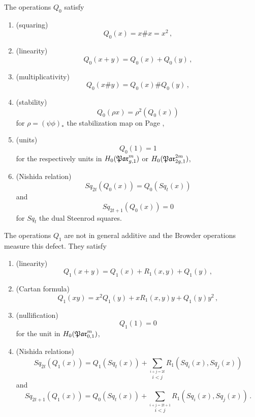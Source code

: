 \begin{prop}
    The operations $Q_0$ satisfy
    \begin{enumerate}
        \item (squaring)
            \[
                Q_0(x) = x \# x = x^2\,,
            \]
        \item (linearity)
            \[
                Q_0(x+y) = Q_0(x) + Q_0(y) \,,
            \]
        \item (multiplicativity)
            \[
                Q_0(x \# y) = Q_0(x) \# Q_0(y) \,,
            \]
        \item (stability)
            \[
                Q_0(\rho x) = \rho^2( Q_0(x))
            \]
            for $\rho = (\psi\phi)_\ast$ the stabilization map on Page \pageref{page:stabilization_map},
        \item (units)
            \[
                Q_0(1) = 1
            \]
            for the respectively units in $H_0( \mathfrak{Par}_{g,1}^m )$ or $H_0(\mathfrak{Par}_{2g,1}^{2m})$,
        \item (Nishida relation)
            \[
                Sq_{2t}(Q_0(x)) = Q_0(Sq_t(x))
            \]
            and
            \[
                Sq_{2t+1}(Q_0(x)) = 0
            \]
            for $Sq_t$ the dual Steenrod squares.
    \end{enumerate}
\end{prop}

\begin{prop}
    The operations $Q_1$ are not in general additive and the Browder operations measure this defect.
    They satisfy
    \begin{enumerate}
        \item (linearity)
            \[
                Q_1(x+y) = Q_1(x) + R_1(x,y) + Q_1(y) \,,
            \]
        \item (Cartan formula)
            \[
                Q_1(xy) = x^2Q_1(y) + xR_1(x,y)y + Q_1(y)y^2 \,,
            \]
        \item (nullification)
            \[
                Q_1(1) = 0
            \]
            for the unit in $H_0(\mathfrak{Par}_{0,1}^m)$,
        \item (Nishida relations)
            \[
                Sq_{2t}(Q_1(x)) = Q_1(Sq_t(x)) + \sum_{\stackrel{i+j=2t}{i<j}} R_1(Sq_i(x), Sq_j(x))
            \]
            and
            \[
                Sq_{2t+1}(Q_1(x)) = Q_0(Sq_t(x)) + \sum_{\stackrel{i+j=2t+1}{i<j}} R_1(Sq_i(x), Sq_j(x)) \,.
            \]
    \end{enumerate}
\end{prop}

